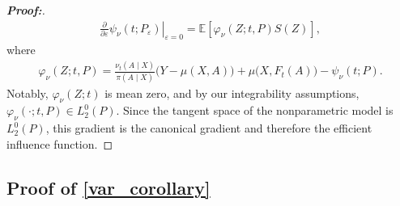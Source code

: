 \documentclass[11pt,twoside]{article}
\theoremstyle{definition}
\theoremstyle{remark}
\begin{document}
\begin{proof}[\textbf{Proof:}]
\begin{align*}
    \left. \frac{\partial}{\partial\varepsilon} \psi_\nu(t;P_\varepsilon) \right|_{\varepsilon=0} = \mathbb{E}\left[\varphi_\nu(Z;t,P)S(Z) \right],
\end{align*}
where 
\begin{align*}
    \varphi_\nu(Z; t, P) =  \frac{\nu_t(A \mid X)}{\pi(A \mid X)}\big(Y - \mu(X, A) \big) +  \mu\big(X, F_t(A)\big) - \psi_\nu(t; P).
\end{align*}
Notably, $\varphi_\nu(Z; t)$ is mean zero, and by our integrability assumptions, $\varphi_\nu(\cdot;t,P)\in L_2^0(P)$. Since the tangent space of the nonparametric model is $L_2^0(P)$, this gradient is the canonical gradient and therefore the efficient influence function.
\end{proof}

\subsection{Proof of \cref{var_corollary}} \label{var_corollary_proof}
\end{document}
